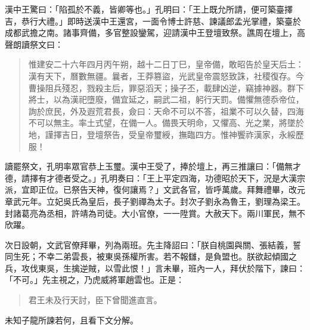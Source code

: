 漢中王驚曰：「陷孤於不義，皆卿等也。」孔明曰：「王上既允所請，便可築臺擇吉，恭行大禮。」即時送漢中王還宮，一面令博士許慈、諫議郎孟光掌禮，築臺於成都武擔之南。諸事齊備，多官整設鑾駕，迎請漢中王登壇致祭。譙周在壇上，高聲朗讀祭文曰：

\begin{quote}
惟建安二十六年四月丙午朔，越十二日丁巳，皇帝備，敢昭告於皇天后土：漢有天下，曆數無疆。曩者，王莽篡盜，光武皇帝震怒致誅，社稷復存。今曹操阻兵殘忍，戮殺主后，罪惡滔天；操子丕，載肆凶逆，竊據神器。群下將士，以為漢祀墮廢，備宜延之，嗣武二祖，躬行天罰。備懼無德忝帝位，詢於庶民，外及遐荒君長，僉曰：天命不可以不答，祖業不可以久替，四海不可以無主。率土式望，在備一人。備畏天明命，又懼高、光之業，將墜於地，謹擇吉日，登壇祭告，受皇帝璽綬，撫臨四方。惟神饗祚漢家，永綏歷服！
\end{quote}

讀罷祭文，孔明率眾官恭上玉璽。漢中王受了，捧於壇上，再三推讓曰：「備無才德，請擇有才德者受之。」孔明奏曰：「王上平定四海，功德昭於天下，況是大漢宗派，宜即正位。已祭告天神，復何讓焉？」文武各官，皆呼萬歲。拜舞禮畢，改元章武元年。立妃吳氏為皇后，長子劉禪為太子。封次子劉永為魯王，劉理為梁王。封諸葛亮為丞相，許靖為司徒。大小官僚，一一陞賞。大赦天下。兩川軍民，無不欣躍。

次日設朝，文武官僚拜畢，列為兩班。先主降詔曰：「朕自桃園與關、張結義，誓同生死；不幸二弟雲長，被東吳孫權所害。若不報讎，是負盟也。朕欲起傾國之兵，攻伐東吳，生擒逆賊，以雪此恨！」言未畢，班內一人，拜伏於階下，諫曰：「不可。」先主視之，乃虎威將軍趙雲也。正是：

\begin{quote}
君王未及行天討，臣下曾聞進直言。
\end{quote}

未知子龍所諫若何，且看下文分解。

